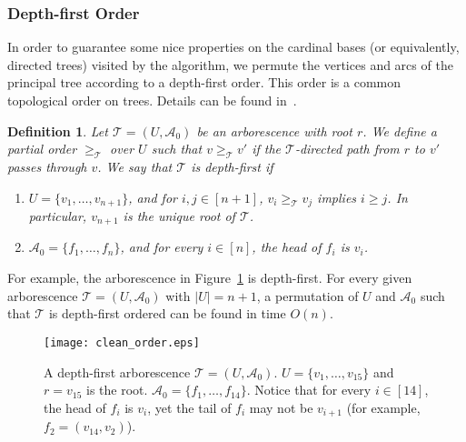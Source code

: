 \documentclass[11pt]{article}
\newtheorem{definition}[theorem]{Definition}
\begin{document}
\subsubsection{Depth-first Order}\label{sec:DFO}




In order to guarantee some nice properties on the cardinal bases (or equivalently, directed trees) visited by the algorithm, we permute the vertices and arcs of the principal tree according to a depth-first order. This order is a common topological order on trees. Details can be found in~\cite{cormen2022introduction}. \begin{definition}\label{def:depth-first}
    Let $\mathcal{T}=(U,\mathcal{A}_0)$ be an arborescence with root $r$. We define a partial order $\ge_\mathcal{T}$ over $U$ such that $v\ge_\mathcal{T} v'$ if the $\mathcal{T}$-directed path from $r$ to $v'$ passes through $v$. We say that $\mathcal{T}$ is \emph{depth-first} if
   \begin{enumerate}
    \item $U=\{v_1,\dots,v_{n+1}\}$, and for $i,j\in [n+1]$, $v_i\ge_\mathcal{T} v_j$ implies $i\ge j$. In particular, $v_{n+1}$ is the unique root of $\mathcal{T}$.
    \item $\mathcal{A}_0=\{f_1,\dots,f_n\}$, and for every $i\in [n]$, the head of $f_i$ is $v_i$.
   \end{enumerate}\end{definition}
For example, the arborescence in Figure~\ref{fig:clean_order} is depth-first. For every given arborescence $\mathcal{T}=(U,\mathcal{A}_0)$ with $|U|=n+1$, a permutation of $U$ and $\mathcal{A}_0$ such that $\mathcal{T}$ is depth-first ordered can be found in time $O(n)$. \begin{figure}[h!]
    \centering
    \texttt{[image: clean\_order.eps]}
    \caption{A depth-first arborescence $\mathcal{T}=(U,\mathcal{A}_0)$. $U=\{v_1,\dots,v_{15}\}$ and $r=v_{15}$ is the root. $\mathcal{A}_0=\{f_1,\dots,f_{14}\}$. Notice that for every $i\in[14]$, the head of $f_i$ is $v_i$, yet the tail of $f_i$ may not be $v_{i+1}$ (for example, $f_2=(v_{14},v_2)$).}
    \label{fig:clean_order}
\end{figure}
\end{document}
